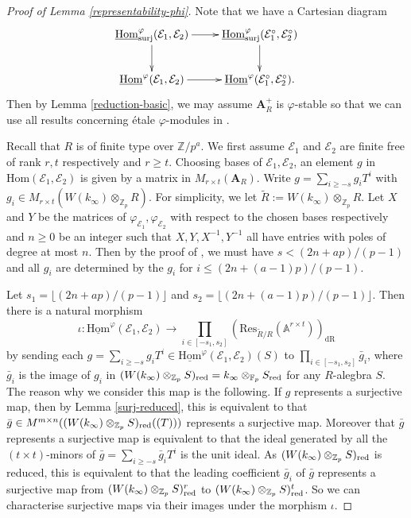 \documentclass[10pt]{article}
\numberwithin{equation}{section}
\newcommand{\bA}{{\mathbb A}}
\newcommand{\bF}{{\mathbb F}}
\newcommand{\bZ}{{\mathbb Z}}
\newcommand{\calE}{{\mathcal E}}
\newcommand{\Hom}{{\mathrm{Hom}}}           %
\newcommand{\dR}{{\mathrm{dR}}}             %
\newcommand{\bfA}{{\textbf{A}}}
\newcommand{\surj}{\mathrm{surj}}
\newcommand{\Res}{\mathrm{Res}}
\begin{document}
\begin{proof}[Proof of Lemma \ref{representability-phi}]
Note that we have a Cartesian diagram
\begin{equation}
    \xymatrix{
    \underline\Hom_{\surj}^{\varphi}(\calE_1,\calE_2)\ar[r]\ar[d]& \underline\Hom_{\surj}^{\varphi}(\calE_1^{\circ},\calE_2^{\circ})\ar[d]\\
    \underline\Hom^{\varphi}(\calE_1,\calE_2)\ar[r]& \underline\Hom^{\varphi}(\calE_1^{\circ},\calE_2^{\circ}).
    }
\end{equation}
Then by Lemma \ref{reduction-basic}, we may assume $\bfA_R^{+}$ is $\varphi$-stable so that we can use all results concerning \'etale $\varphi$-modules in \cite{EG21}.

Recall that $R$ is of finite type over $\bZ/p^a$. We first assume $\calE_1$ and $\calE_2$ are finite free of rank $r,t$ respectively and $r\geq t$. Choosing bases of $\calE_1,\calE_2$, an element $g$ in $\Hom(\calE_1,\calE_2)$ is given by a matrix in $M_{r\times t}(\bfA_R)$. Write $g=\sum_{i\geq -s}g_iT^i$ with $g_i\in M_{r\times t}(W(k_{\infty})\otimes_{\bZ_p}R)$. For simplicity, we let $\tilde R:=W(k_{\infty})\otimes_{\bZ_p}R$. Let $X$ and $Y$ be the matrices of $\varphi_{\calE_1},\varphi_{\calE_2}$ with respect to the chosen bases respectively and $n\geq 0$ be an integer such that $X,Y,X^{-1},Y^{-1}$ all have entries with poles of degree at most $n$. Then by the proof of \cite[Proposition 5.4.8]{EG21}, we must have $s<(2n+ap)/(p-1)$ and all $g_i$ are determined by the $g_i$ for $i\leq (2n+(a-1)p)/(p-1)$.

Let $s_1=\lfloor {(2n+ap)/(p-1)}\rfloor$ and $s_2=\lfloor (2n+(a-1)p)/(p-1)\rfloor$. Then there is a natural morphism
\[
\iota:\underline\Hom^{\varphi}(\calE_1,\calE_2)\to \prod_{i\in [-s_1,s_2]} (\Res_{\tilde R/R}(\bA^{r\times t}))_{\dR}
\]
by sending each $g=\sum_{i\geq -s}g_iT^i\in \underline\Hom^{\varphi}(\calE_1,\calE_2)(S)$ to $\prod_{i\in [-s_1,s_2]}\bar g_i$, where $\bar g_i$ is the image of $g_i$ in $(W(k_{\infty})\otimes_{\bZ_p}S)_{\rm red}=k_{\infty}\otimes_{\bF_p}S_{\rm red}$ for any $R$-alegbra $S$. The reason why we consider this map is the following. If $g$ represents a surjective map, then by Lemma \ref{surj-reduced}, this is equivalent to that $\bar g\in M^{m\times n}((W(k_{\infty})\otimes_{\bZ_p}S)_{\rm red}((T)))$ represents a surjective map. Moreover that $\bar g$ represents a surjective map is equivalent to that the ideal generated by all the $(t\times t)$-minors of $\bar g=\sum_{i\geq -s}\bar g_iT^i$ is the unit ideal. As $(W(k_{\infty})\otimes_{\bZ_p}S)_{\rm red}$ is reduced, this is equivalent to that the leading coefficient $\bar g_i$ of $\bar g$ represents a surjective map from $(W(k_{\infty})\otimes_{\bZ_p}S)_{\rm red}^r$ to $(W(k_{\infty})\otimes_{\bZ_p}S)_{\rm red}^t$. So we can characterise surjective maps via their images under the morphism $\iota$.


\end{proof}
\end{document}
